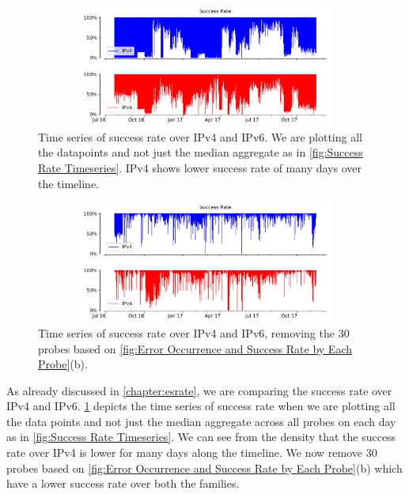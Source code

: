 \begin{figure}[!ht]
	\centering
	\includegraphics[keepaspectratio, height=4cm, width=15cm]{figures/success/netflix-success-rate-timeseries-no-median.pdf}
	\caption[Success Rate Timeseries all datapoints]{Time series of success rate over IPv4 and IPv6. We are plotting all the datapoints and not just the median aggregate as in \cref{fig:Success Rate Timeseries}. IPv4 shows lower success rate of many days over the timeline.}
	\label{fig:Success Rate Timeseries all datapoints}
\end{figure}
\begin{figure}[!ht]
	\centering
	\includegraphics[keepaspectratio, height=4cm, width=15cm]{figures/success/netflix-success-rate-timeseries-no-median-outlier.pdf}
	\caption[Success Rate Timeseries all data points without Outliers]{Time series of success rate over IPv4 and IPv6, removing the 30 probes based on \cref{fig:Error Occurrence and Success Rate by Each Probe}(b).}
	\label{fig:Success Rate Timeseries all datapoints wihout Outliers}
\end{figure}
As already discussed in \cref{chapter:esrate}, we are comparing the success rate over IPv4 and IPv6. \cref{fig:Success Rate Timeseries all datapoints} depicts the time series of 
success rate
when we are plotting all the data points and not just the median aggregate across all probes on each day as in \cref{fig:Success Rate Timeseries}. We can see from the density that the success rate over IPv4 is lower for many days along the timeline. We now remove 30 probes based on \cref{fig:Error Occurrence and Success Rate by Each Probe}(b) which have a lower success rate over both the families.

